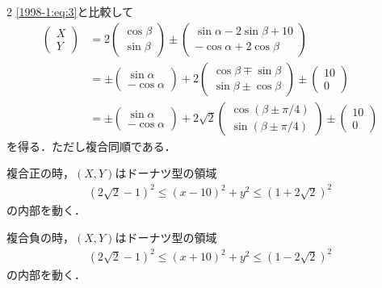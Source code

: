 \documentclass[../../../../main.tex]{subfiles}
\begin{document}
\begin{multicols}{2}
    \cref{1998-1:eq:3}と比較して
    \begin{align*}
        \begin{pmatrix} X \\ Y \end{pmatrix}
         & = 2\begin{pmatrix} \cos\beta \\ \sin\beta \end{pmatrix} \pm \begin{pmatrix} \sin\alpha - 2\sin\beta + 10 \\ -\cos\alpha + 2\cos\beta \end{pmatrix}                                             \\
         & = \pm\begin{pmatrix} \sin\alpha \\ -\cos\alpha \end{pmatrix} + 2\begin{pmatrix} \cos\beta \mp \sin\beta \\ \sin\beta \pm \cos\beta \end{pmatrix} \pm \begin{pmatrix} 10 \\ 0 \end{pmatrix}     \\
         & = \pm\begin{pmatrix} \sin\alpha \\ -\cos\alpha \end{pmatrix} + 2\sqrt{2}\begin{pmatrix} \cos(\beta \pm \pi/4) \\ \sin(\beta \pm \pi/4) \end{pmatrix} \pm \begin{pmatrix} 10 \\ 0 \end{pmatrix}
    \end{align*}
    を得る．ただし複合同順である．

    複合正の時，$(X, Y)$はドーナツ型の領域
    \begin{align*}
        (2\sqrt{2}-1)^2 \le (x-10)^2+y^2 \le (1+2\sqrt{2})^2
    \end{align*}
    の内部を動く．

    複合負の時，$(X, Y)$はドーナツ型の領域
    \begin{align*}
        (2\sqrt{2}-1)^2 \le (x+10)^2+y^2 \le (1-2\sqrt{2})^2
    \end{align*}
    の内部を動く．


\end{multicols}
\end{document}
